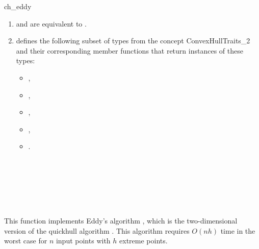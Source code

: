 \begin{ccRefFunction}{ch_eddy}
\begin{enumerate}
   \item    {} and 
            are equivalent to .
   \item    {} defines the following subset of types from
            the concept ConvexHullTraits\_2 and their corresponding member
            functions that return instances of these types:
            \begin{itemize}
                \item {},
		\item {},
                \item {},
                \item {}, 
                \item {}.
            \end{itemize}
\end{enumerate}

\ccSeeAlso

 \\
 \\
 \\
 \\
 \\

\ccImplementation

This function implements Eddy's algorithm 
\cite{e-nchap-77}, which  is the two-dimensional version of the quickhull
algorithm \cite{bdh-qach-96}%
. 
This algorithm requires $O(n h)$ time 
in the worst case for $n$ input points with $h$ extreme points.  

\end{ccRefFunction}


